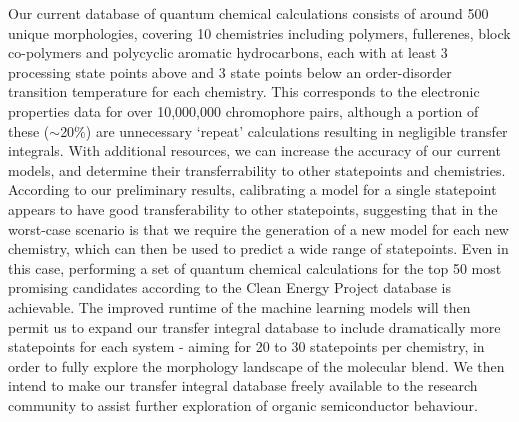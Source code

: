 \documentclass[12pt]{article}
\begin{document}


Our current database of quantum chemical calculations consists of around 500 unique morphologies, covering 10 chemistries including polymers, fullerenes, block co-polymers and polycyclic aromatic hydrocarbons, each with at least 3 processing state points above and 3 state points below an order-disorder transition temperature for each chemistry.
This corresponds to the electronic properties data for over 10,000,000 chromophore pairs, although a portion of these ($\sim$20\%) are unnecessary `repeat' calculations resulting in negligible transfer integrals.
With additional resources, we can increase the accuracy of our current models, and determine their transferrability to other statepoints and chemistries.
According to our preliminary results, calibrating a model for a single statepoint appears to have good transferability to other statepoints, suggesting that in the worst-case scenario is that we require the generation of a new model for each new chemistry, which can then be used to predict a wide range of statepoints.
Even in this case, performing a set of quantum chemical calculations for the top 50 most promising candidates according to the Clean Energy Project database is achievable.%
The improved runtime of the machine learning models will then permit us to expand our transfer integral database to include dramatically more statepoints for each system - aiming for 20 to 30 statepoints per chemistry, in order to fully explore the morphology landscape of the molecular blend.
We then intend to make our transfer integral database freely available to the research community to assist further exploration of organic semiconductor behaviour.


\end{document}

